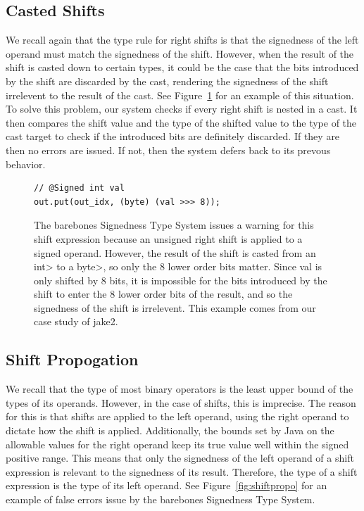 \subsection{Casted Shifts}
We recall again that the type rule for right shifts is that the signedness
of the left
operand must match the signedness of the shift. However, when the result of the
shift is casted down to certain types, it could be the case that the bits
introduced by the shift are discarded by the cast, rendering the signedness of
the shift irrelevent to the result of the cast.
See Figure~\ref{fig:castedshift} for an example of this situation. To solve this
problem, our system checks if every right shift is nested in a cast.
It then compares the
shift value and the type of the shifted value to the type of the cast target
to check if the introduced bits are definitely discarded.
If they are then no errors are issued.
If not, then the system defers back to its prevous behavior.

\begin{figure}[h]
\begin{lstlisting}
// @Signed int val
out.put(out_idx, (byte) (val >>> 8));
\end{lstlisting}
\vspace{-10pt}
\caption{
  The barebones Signedness Type System issues a warning for this shift
expression because an unsigned right shift is applied
to a signed operand. However, the result of the shift
is casted from an \<int> to a \<byte>, so only the 8 lower
order bits matter. Since val is only shifted by 8 bits,
it is impossible for the bits introduced by the shift
to enter the 8 lower order bits of the result, and so
the signedness of the shift is irrelevent. This example
comes from our case study of jake2.
}
\label{fig:castedshift}
\end{figure}

\subsection{Shift Propogation}
We recall that the type of most binary operators is the least upper bound of
the types of its operands.
However, in the case of shifts, this is imprecise.
The reason for this is that shifts are applied to the left operand, using the
right operand to dictate how the shift is applied. Additionally, the bounds
set by Java on the allowable values for the right operand keep its true value
well within the signed positive range. This means that only the signedness
of the left operand of a shift expression is relevant to the signedness of
its result.
Therefore, the type of a shift expression is the type of its left operand. See
Figure~\ref{fig:shiftpropo} for an example of false errors issue by the
barebones Signedness Type System.

